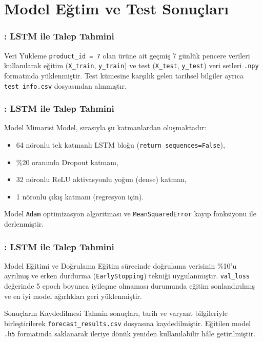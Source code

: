 \documentclass[12pt]{beamer}
\begin{document}
	
	
\section{Model Eğtim ve Test Sonuçları}
	
	\begin{frame}
		\frametitle{\insertsection: LSTM ile Talep Tahmini}
		\begin{block}{Veri Yükleme}
			\texttt{product\_id = 7} olan ürüne ait geçmiş 7 günlük pencere verileri kullanılarak eğitim (\texttt{X\_train}, \texttt{y\_train}) ve test (\texttt{X\_test}, \texttt{y\_test}) veri setleri \texttt{.npy} formatında yüklenmiştir. Test kümesine karşılık gelen tarihsel bilgiler ayrıca \texttt{test\_info.csv} dosyasından alınmıştır.
		\end{block}
		
		\vspace{0.5em}
		
		
	\end{frame}
	
	
	\begin{frame}
		\frametitle{\insertsection: LSTM ile Talep Tahmini}
		
		\begin{block}{Model Mimarisi}
			Model, sırasıyla şu katmanlardan oluşmaktadır:
			\begin{itemize}
				\item 64 nöronlu tek katmanlı LSTM bloğu (\texttt{return\_sequences=False}),
				\item \%20 oranında Dropout katmanı,
				\item 32 nöronlu ReLU aktivasyonlu yoğun (dense) katman,
				\item 1 nöronlu çıkış katmanı (regresyon için).
			\end{itemize}
			Model \texttt{Adam} optimizasyon algoritması ve \texttt{MeanSquaredError} kayıp fonksiyonu ile derlenmiştir.
		\end{block}
	\end{frame}
	
	
	
	\begin{frame}
		\frametitle{\insertsection: LSTM ile Talep Tahmini}
		\begin{block}{Model Eğitimi ve Doğrulama}
			Eğitim sürecinde doğrulama verisinin \%10'u ayrılmış ve erken durdurma (\texttt{EarlyStopping}) tekniği uygulanmıştır. \texttt{val\_loss} değerinde 5 epoch boyunca iyileşme olmaması durumunda eğitim sonlandırılmış ve en iyi model ağırlıkları geri yüklenmiştir.
		\end{block}
		
		\vspace{0.5em}
		
		
		\begin{block}{Sonuçların Kaydedilmesi}
			Tahmin sonuçları, tarih ve varyant bilgileriyle birleştirilerek \texttt{forecast\_results.csv} dosyasına kaydedilmiştir. Eğitilen model \texttt{.h5} formatında saklanarak ileriye dönük yeniden kullanılabilir hâle getirilmiştir.
		\end{block}
	\end{frame}
	
\end{document}
